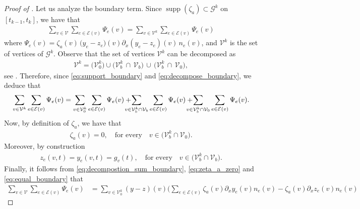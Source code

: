 \documentclass[a4paper, 10pt, english]{article}
\DeclareMathOperator{\supp}{supp}
\begin{document}
\begin{proof}[Proof of  ]
    \noindent
   Let us analyze the boundary term.  Since $\supp(\zeta_a) \subset \mathcal{G}^k$ on $[t_{k-1}, t_k]$, we have that 
\begin{align}\label{eq:support_boundary}
     \sum_{v \in \mathcal{V}}
      \sum_{e \in \mathcal{E}(v)}
         \Psi_e(v) =  \sum_{v \in \mathcal{V}^k}
      \sum_{e \in \mathcal{E}(v)}
         \Psi_e(v)
\end{align}
where $\Psi_e(v) = \zeta_a(v)\,\bigl(y_e - z_e\bigr)(v)\partial_x(y_e - z_e)(v)\,n_e(v)$, and  $\mathcal{V}^k$ is the set of vertices of $\mathcal{G}^k$. Observe that the set of vertices $\mathcal{V}^k$ can be decomposed as 
    \begin{align}\label{eq:decompose_boundary}
      \mathcal{V}^k
      =
      \bigl(\mathcal{V}_0^k\bigr)
      \cup
      \bigl(\mathcal{V}_b^k \,\cap\, \mathcal{V}_b\bigr)
         \,\cup\,
         \bigl(\mathcal{V}_b^k \,\cap\, \mathcal{V}_0\bigl),
    \end{align}
    see . Therefore, since \eqref{eq:support_boundary} and \eqref{eq:decompose_boundary}, we deduce that
\begin{align}\label{eq:decompostion_sum_boundary}
      \sum_{v \in \mathcal{V}^k}
      \sum_{e \in \mathcal{E}(v)}
         \Psi_e(v) =\sum_{v \in \mathcal{V}^k_0}
      \sum_{e \in \mathcal{E}(v)}
          \Psi_e(v)+\hspace{-0.4cm}\sum_{v \in \mathcal{V}_b^k \cap \mathcal{V}_b}
      \sum_{e \in \mathcal{E}(v)}\Psi_e(v)+\hspace{-0.4cm}\sum_{v \in \mathcal{V}_b^k \cap \mathcal{V}_0}
      \sum_{e \in \mathcal{E}(v)}
          \Psi_e(v).
    \end{align}
Now, by definition of $\zeta_a$, we have that
\begin{align}\label{eq:zeta_a_zero}
\zeta_a(v) = 0, \quad \text{for every}\quad v \in \bigl(\mathcal{V}_b^k \cap \mathcal{V}_0\bigr).
\end{align}
Moreover, by construction 
\begin{align}\label{eq:equal_boundary}
z_e(v,t) = y_e(v,t) = g_v(t), \quad \text{for every}\quad v \in \bigl(\mathcal{V}_b^k \cap \mathcal{V}_b\bigr).
\end{align}
Finally, it follows from \eqref{eq:decompostion_sum_boundary}, \eqref{eq:zeta_a_zero} and \eqref{eq:equal_boundary} that
\begin{align*}
\sum_{v \in \mathcal{V}}\sum_{e \in \mathcal{E}(v)}
   \Psi_e(v) &=\sum_{v \in \mathcal{V}^k_0}
   (y - z)(v)
   \bigg(
     \sum_{e \in \mathcal{E}(v)} \zeta_a(v)\partial_x y_e(v)n_e(v)-\zeta_a(v)\partial_x z_e(v)n_e(v)

\end{align*}
\end{proof}
\end{document}
